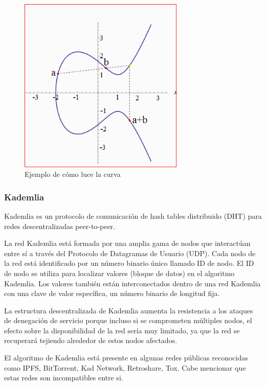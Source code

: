 \begin{figure}[htbp!] 
\centering    
\includegraphics[width=0.7\textwidth]{secp256k1-example}
\caption[secp256k1]{Ejemplo de cómo luce la curva}
\label{fig:secp256k1-example}
\end{figure}

\subsubsection{Kademlia}
Kademlia es un protocolo de comunicación de hash tables distribuido (DHT) para redes
descentralizadas peer-to-peer.

La red Kademlia está formada por una amplia gama de nodos que interactúan entre sí a través del
Protocolo de Datagramas de Usuario (UDP). Cada nodo de la red está identificado por un número
binario único llamado ID de nodo. El ID de nodo se utiliza para localizar valores (bloque de datos)
en el algoritmo Kademlia. Los valores también están interconectados dentro de una red Kademlia con
una clave de valor específica, un número binario de longitud fija.

La estructura descentralizada de Kademlia aumenta la resistencia a los ataques de denegación de
servicio porque incluso si se comprometen múltiples nodos, el efecto sobre la disponibilidad de la
red sería muy limitado, ya que la red se recuperará tejiendo alrededor de estos nodos afectados.

El algoritmo de Kademlia está presente en algunas redes públicas reconocidas como IPFS, BitTorrent,
Kad Network, Retroshare, Tox. Cabe mencionar que estas redes son incompatibles entre si.

